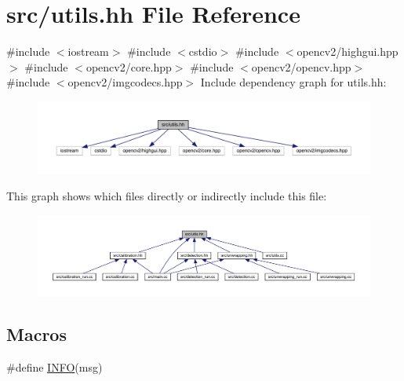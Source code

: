 \hypertarget{utils_8hh}{}\section{src/utils.hh File Reference}
\label{utils_8hh}
{\ttfamily \#include $<$iostream$>$}\newline
{\ttfamily \#include $<$cstdio$>$}\newline
{\ttfamily \#include $<$opencv2/highgui.\+hpp$>$}\newline
{\ttfamily \#include $<$opencv2/core.\+hpp$>$}\newline
{\ttfamily \#include $<$opencv2/opencv.\+hpp$>$}\newline
{\ttfamily \#include $<$opencv2/imgcodecs.\+hpp$>$}\newline
Include dependency graph for utils.\+hh\+:
\nopagebreak
\begin{figure}[H]
\begin{center}
\leavevmode
\includegraphics[width=350pt]{utils_8hh__incl}
\end{center}
\end{figure}
This graph shows which files directly or indirectly include this file\+:
\nopagebreak
\begin{figure}[H]
\begin{center}
\leavevmode
\includegraphics[width=350pt]{utils_8hh__dep__incl}
\end{center}
\end{figure}
\subsection*{Macros}
\begin{DoxyCompactItemize}
\item 
\#define \mbox{\hyperlink{utils_8hh_a3ae64706314066fdc8b6c8029a915aa7}{I\+N\+FO}}(msg)
\end{DoxyCompactItemize}
